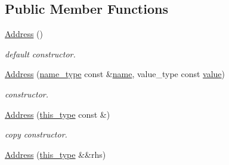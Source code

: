 \subsection*{Public Member Functions}
\begin{DoxyCompactItemize}
\item 
\hypertarget{classhryky_1_1reduction_1_1_address_a419597e92e0659824ace475c362d8137}{\hyperlink{classhryky_1_1reduction_1_1_address_a419597e92e0659824ace475c362d8137}{Address} ()}\label{classhryky_1_1reduction_1_1_address_a419597e92e0659824ace475c362d8137}

\begin{DoxyCompactList}\small\item\em default constructor. \end{DoxyCompactList}\item 
\hypertarget{classhryky_1_1reduction_1_1_address_a7d4266f680ba4d6c537996ec8db60011}{\hyperlink{classhryky_1_1reduction_1_1_address_a7d4266f680ba4d6c537996ec8db60011}{Address} (\hyperlink{namespacehryky_1_1reduction_ac686c30a4c8d196bbd0f05629a6b921f}{name\-\_\-type} const \&\hyperlink{classhryky_1_1reduction_1_1_base_a842569265d741905eb8a353d3935f1d1}{name}, value\-\_\-type const \hyperlink{classhryky_1_1reduction_1_1_address_a949fd4c7bef03419550491b9c2d46801}{value})}\label{classhryky_1_1reduction_1_1_address_a7d4266f680ba4d6c537996ec8db60011}

\begin{DoxyCompactList}\small\item\em constructor. \end{DoxyCompactList}\item 
\hypertarget{classhryky_1_1reduction_1_1_address_aac1bff37875dcac0687bd2775aa5bde0}{\hyperlink{classhryky_1_1reduction_1_1_address_aac1bff37875dcac0687bd2775aa5bde0}{Address} (\hyperlink{classhryky_1_1reduction_1_1_address_aab723227e4610c73cfa610169d14ad54}{this\-\_\-type} const \&)}\label{classhryky_1_1reduction_1_1_address_aac1bff37875dcac0687bd2775aa5bde0}

\begin{DoxyCompactList}\small\item\em copy constructor. \end{DoxyCompactList}\item 
\hypertarget{classhryky_1_1reduction_1_1_address_a13ad271aff95fa0706a62e4df1e9eb6a}{\hyperlink{classhryky_1_1reduction_1_1_address_a13ad271aff95fa0706a62e4df1e9eb6a}{Address} (\hyperlink{classhryky_1_1reduction_1_1_address_aab723227e4610c73cfa610169d14ad54}{this\-\_\-type} \&\&rhs)}\label{classhryky_1_1reduction_1_1_address_a13ad271aff95fa0706a62e4df1e9eb6a}


\end{DoxyCompactItemize}
